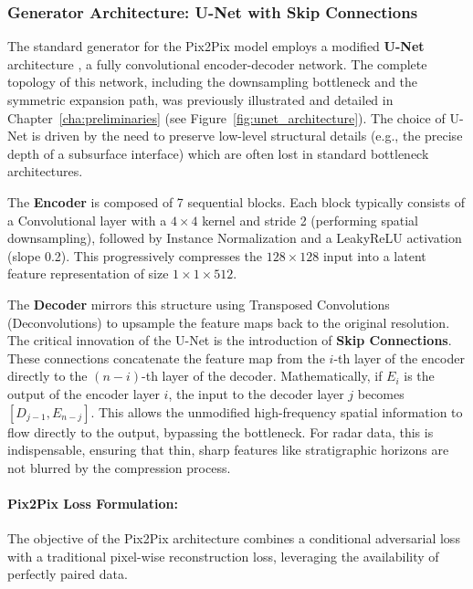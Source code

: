 \subsubsection{Generator Architecture: U-Net with Skip Connections}
\label{subsubsec:unet_generator}
The standard generator for the Pix2Pix model employs a modified \textbf{U-Net} architecture \cite{Ronneberger_2015}, a fully convolutional encoder-decoder network.
The complete topology of this network, including the downsampling bottleneck and the symmetric expansion path, was previously illustrated and detailed in Chapter~\ref{cha:preliminaries} (see Figure~\ref{fig:unet_architecture}).
The choice of U-Net is driven by the need to preserve low-level structural details (e.g., the precise depth of a subsurface interface) which are often lost in standard bottleneck architectures.

The \textbf{Encoder} is composed of 7 sequential blocks.
Each block typically consists of a Convolutional layer with a $4 \times 4$ kernel and stride 2 (performing spatial downsampling), followed by Instance Normalization and a LeakyReLU activation (slope 0.2).
This progressively compresses the $128 \times 128$ input into a latent feature representation of size $1 \times 1 \times 512$. 

The \textbf{Decoder} mirrors this structure using Transposed Convolutions (Deconvolutions) to upsample the feature maps back to the original resolution.
The critical innovation of the U-Net is the introduction of \textbf{Skip Connections}.
These connections concatenate the feature map from the $i$-th layer of the encoder directly to the $(n-i)$-th layer of the decoder.
Mathematically, if $E_i$ is the output of the encoder layer $i$, the input to the decoder layer $j$ becomes $[D_{j-1}, E_{n-j}]$.
This allows the unmodified high-frequency spatial information to flow directly to the output, bypassing the bottleneck.
For radar data, this is indispensable, ensuring that thin, sharp features like stratigraphic horizons are not blurred by the compression process.

\paragraph{Pix2Pix Loss Formulation:}
The objective of the Pix2Pix architecture combines a conditional adversarial loss with a traditional pixel-wise reconstruction loss, leveraging the availability of perfectly paired data.

